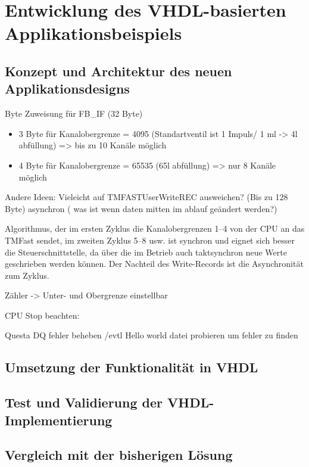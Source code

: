 \chapter{Entwicklung des VHDL-basierten Applikationsbeispiels}

\section{Konzept und Architektur des neuen Applikationsdesigns}

Byte Zuweisung für FB\_IF (32 Byte)
    \begin{itemize}
        \item 3 Byte für Kanalobergrenze = 4095 (Standartventil ist 1 Impuls/ 1 ml -> 4l abfüllung) => bis zu 10 Kanäle möglich
        \item 4 Byte für Kanalobergrenze = 65535 (65l abfüllung) => nur 8 Kanäle möglich
    \end{itemize}

Andere Ideen:
Vieleicht auf TMFASTUserWriteREC ausweichen? (Bis zu 128 Byte)
asynchron ( was ist wenn daten mitten im ablauf geändert werden?)

Algorithmus, der im ersten Zyklus die Kanalobergrenzen 1–4 von der CPU an das TMFast sendet, im zweiten Zyklus 5–8 usw.
ist synchron und eignet sich besser
die Steuerschnittstelle, da über die im Betrieb auch taktsynchron neue Werte geschrieben werden können. Der Nachteil des Write-Records ist die Asynchronität zum Zyklus.


Zähler -> Unter- und Obergrenze einstellbar

CPU Stop beachten:

Questa DQ fehler beheben /evtl Hello world datei probieren um fehler zu finden
\section{Umsetzung der Funktionalität in VHDL}
\section{Test und Validierung der VHDL-Implementierung}
\section{Vergleich mit der bisherigen Lösung}